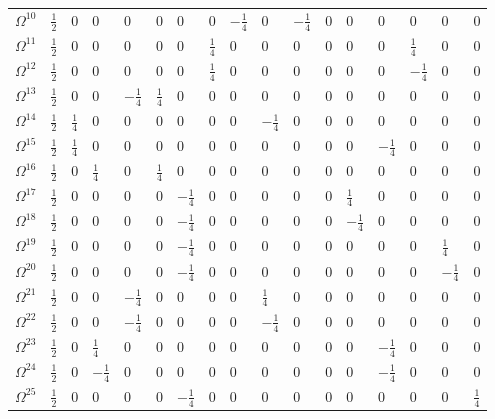 \begin{tiny}
\begin{table}[]
\begin{tabular}{lllllllllllllllll}
            $\Omega^{10}$ & $\frac{1}{2}$	&	0	&	0	&	0	&	0	&	0	&	0	&	$-\frac{1}{4}$	&	0	&	$-\frac{1}{4}$	&	0	&	0	&	0	&	0	&	0	&	0 \\ 
            $\Omega^{11}$ & $\frac{1}{2}$	&	0	&	0	&	0	&	0	&	0	&	$\frac{1}{4}$	&	0	&	0	&	0	&	0	&	0	&	0	&	$\frac{1}{4}$	&	0	&	0 \\ 
            $\Omega^{12}$ & $\frac{1}{2}$	&	0	&	0	&	0	&	0	&	0	&	$\frac{1}{4}$	&	0	&	0	&	0	&	0	&	0	&	0	&	$-\frac{1}{4}$	&	0	&	0 \\ 
            $\Omega^{13}$ & $\frac{1}{2}$	&	0	&	0	&	$-\frac{1}{4}$	&	$\frac{1}{4}$	&	0	&	0	&	0	&	0	&	0	&	0	&	0	&	0	&	0	&	0	&	0 \\ 
            $\Omega^{14}$ & $\frac{1}{2}$	&	$\frac{1}{4}$	&	0	&	0	&	0	&	0	&	0	&	0	&	$-\frac{1}{4}$	&	0	&	0	&	0	&	0	&	0	&	0	&	0 \\ 
            $\Omega^{15}$ & $\frac{1}{2}$	&	$\frac{1}{4}$	&	0	&	0	&	0	&	0	&	0	&	0	&	0	&	0	&	0	&	0	&	$-\frac{1}{4}$	&	0	&	0	&	0 \\ 
            $\Omega^{16}$ & $\frac{1}{2}$	&	0	&	$\frac{1}{4}$	&	0	&	$\frac{1}{4}$	&	0	&	0	&	0	&	0	&	0	&	0	&	0	&	0	&	0	&	0	&	0 \\ 
            $\Omega^{17}$ & $\frac{1}{2}$	&	0	&	0	&	0	&	0	&	$-\frac{1}{4}$	&	0	&	0	&	0	&	0	&	0	&	$\frac{1}{4}$	&	0	&	0	&	0	&	0 \\ 
            $\Omega^{18}$ & $\frac{1}{2}$	&	0	&	0	&	0	&	0	&	$-\frac{1}{4}$	&	0	&	0	&	0	&	0	&	0	&	$-\frac{1}{4}$	&	0	&	0	&	0	&	0 \\ 
            $\Omega^{19}$ & $\frac{1}{2}$	&	0	&	0	&	0	&	0	&	$-\frac{1}{4}$	&	0	&	0	&	0	&	0	&	0	&	0	&	0	&	0	&	$\frac{1}{4}$	&	0 \\ 
            $\Omega^{20}$ & $\frac{1}{2}$	&	0	&	0	&	0	&	0	&	$-\frac{1}{4}$	&	0	&	0	&	0	&	0	&	0	&	0	&	0	&	0	&	$-\frac{1}{4}$	&	0 \\ 
            $\Omega^{21}$ & $\frac{1}{2}$	&	0	&	0	&	$-\frac{1}{4}$	&	0	&	0	&	0	&	0	&	$\frac{1}{4}$	&	0	&	0	&	0	&	0	&	0	&	0	&	0 \\ 
            $\Omega^{22}$ & $\frac{1}{2}$	&	0	&	0	&	$-\frac{1}{4}$	&	0	&	0	&	0	&	0	&	$-\frac{1}{4}$	&	0	&	0	&	0	&	0	&	0	&	0	&	0 \\ 
            $\Omega^{23}$ & $\frac{1}{2}$	&	0	&	$\frac{1}{4}$	&	0	&	0	&	0	&	0	&	0	&	0	&	0	&	0	&	0	&	$-\frac{1}{4}$	&	0	&	0	&	0 \\ 
            $\Omega^{24}$ & $\frac{1}{2}$	&	0	&	$-\frac{1}{4}$	&	0	&	0	&	0	&	0	&	0	&	0	&	0	&	0	&	0	&	$-\frac{1}{4}$	&	0	&	0	&	0 \\ 
            $\Omega^{25}$ & $\frac{1}{2}$	&	0	&	0	&	0	&	0	&	$-\frac{1}{4}$	&	0	&	0	&	0	&	0	&	0	&	0	&	0	&	0	&	0	&	$\frac{1}{4}$ \\ 

\end{tabular}
\end{table}
\end{tiny}
